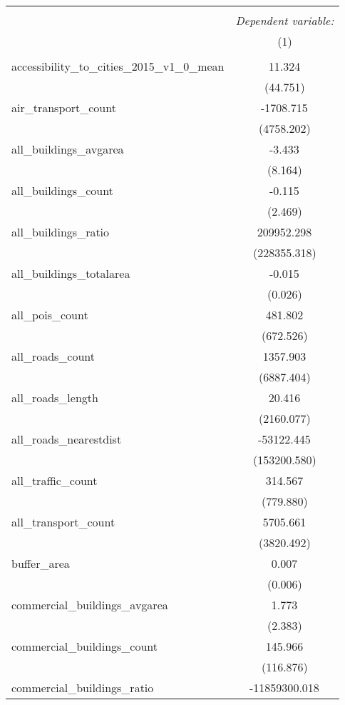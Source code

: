 \begin{table}[!htbp] \centering
\begin{tabular}{@{\extracolsep{5pt}}lc}
\\[-1.8ex]\hline
\hline \\[-1.8ex]
& \multicolumn{1}{c}{\textit{Dependent variable:}} \
\cr \cline{1-2}
\\[-1.8ex] & (1) \\
\hline \\[-1.8ex]
 accessibility_to_cities_2015_v1_0_mean & 11.324$^{}$ \\
  & (44.751) \\
 air_transport_count & -1708.715$^{}$ \\
  & (4758.202) \\
 all_buildings_avgarea & -3.433$^{}$ \\
  & (8.164) \\
 all_buildings_count & -0.115$^{}$ \\
  & (2.469) \\
 all_buildings_ratio & 209952.298$^{}$ \\
  & (228355.318) \\
 all_buildings_totalarea & -0.015$^{}$ \\
  & (0.026) \\
 all_pois_count & 481.802$^{}$ \\
  & (672.526) \\
 all_roads_count & 1357.903$^{}$ \\
  & (6887.404) \\
 all_roads_length & 20.416$^{}$ \\
  & (2160.077) \\
 all_roads_nearestdist & -53122.445$^{}$ \\
  & (153200.580) \\
 all_traffic_count & 314.567$^{}$ \\
  & (779.880) \\
 all_transport_count & 5705.661$^{}$ \\
  & (3820.492) \\
 buffer_area & 0.007$^{}$ \\
  & (0.006) \\
 commercial_buildings_avgarea & 1.773$^{}$ \\
  & (2.383) \\
 commercial_buildings_count & 145.966$^{}$ \\
  & (116.876) \\
 commercial_buildings_ratio & -11859300.018$^{}$ \\

\end{tabular}
\end{table}
